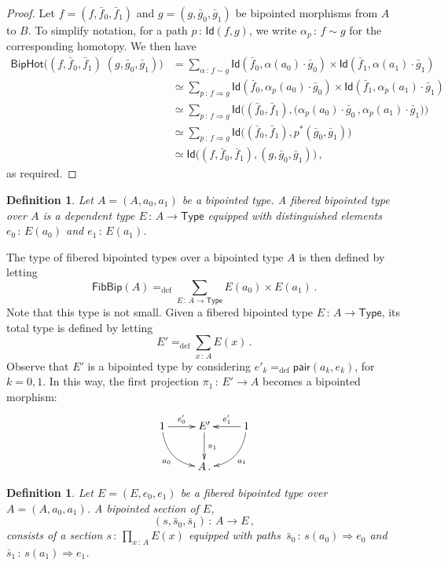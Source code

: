 \documentclass[10pt,a4paper,oneside,reqno]{amsart}
\theoremstyle{mythm}
\theoremstyle{mydef}
\newtheorem{definition}[theorem]{Definition}
\theoremstyle{myrmk}
\newcommand{\deq}{=}
\newcommand{\defeq}{=_{\mathrm{def}}}
\newcommand{\co}{\,{:}\,}
\newcommand{\ct}{\cdot}
\newcommand{\Id}{\mathsf{Id}}
\newcommand{\pair}{\mathsf{pair}}
\newcommand{\U}{\mathsf{Type}}
\newcommand{\BipHot}{\mathsf{BipHot}}
\newcommand{\FibBip}{\mathsf{FibBip}}
\begin{document}
\begin{proof} Let  $f = (f, \bar{f}_0, \bar{f}_1)$ and $g = (g, \bar{g}_0, \bar{g}_1)$ be bipointed
morphisms from $A$ to $B$. To simplify notation, for a path $p \co \Id( f, g)$, we write $\alpha_p \co f \sim g$
for the corresponding homotopy. We then have
\begin{align*}
\BipHot \big( (f,\bar{f}_0,\bar{f}_1) \; (g,\bar{g}_0,\bar{g}_1) \big) & \deq  
\sum_{\alpha \co f \sim g} \Id(\bar{f}_0, \alpha(a_0) \ct \bar{g}_0) \times \Id(\bar{f}_1, \alpha(a_1) \ct \bar{g}_1) \\ 
& \simeq \sum_{p  \co  f \Rightarrow g} \Id(\bar{f}_0, \alpha_p(a_0) \ct \bar{g}_0) \times \Id( \bar{f}_1, \alpha_p(a_1) \ct \bar{g}_1) \\
& \simeq
\sum_{p \co f \Rightarrow g} \Id\big( (\bar{f}_0,\bar{f}_1),  \big(\alpha_p(a_0) \ct \bar{g}_0 \, ,  \alpha_p(a_1) \ct \bar{g}_1) \big) \\
& \simeq
\sum_{p \co  f \Rightarrow g} \Id \big(  (\bar{f}_0,\bar{f}_1),  p^{\ast} (\bar{g}_0,\bar{g}_1) \big) \\
& \simeq  \Id \big( (f,\bar{f}_0,\bar{f}_1) , (g,\bar{g}_0,\bar{g}_1)  \big) \, ,
\end{align*} 
as required.
\end{proof}





\begin{definition} \label{def:fibbipointed}
Let $A = (A, a_0, a_1)$ be a bipointed type. A \emph{fibered bipointed type} over $A$ is a dependent type
$E \co A \to \U$ equipped with distinguished elements $e_0 \co E(a_0)$ and $e_1 \co E(a_1)$.
\end{definition}

The type of  fibered bipointed types over a bipointed type $A$ is then defined by letting
\[
\FibBip(A) \defeq \sum_{E \co A \to \U} E(a_0) \times E(a_1)  \, .
 \]
 Note that this type is not small. 
Given a fibered bipointed type $E \co A \to \U$, its total type is defined by letting
\[
E'  \defeq \sum_{x \co A} E(x) \, .
\] 
Observe that $E'$ is a bipointed type by considering $e'_k \defeq \pair(a_k, e_k)$, 
for $k =  0, 1$. In this way, the first projection $\pi_1 \co E' \to A$ becomes a bipointed morphism:
\[
\xymatrix{
1 \ar@/_1pc/[dr]_{a_0} \ar[r]^-{e'_0} & E' \ar[d]^{\pi_1} & 1 \ar[l]_-{e'_1} \ar@/^1pc/[dl]^{a_1} \\ 
 & A \, .& }
 \]



\begin{definition} \label{def:fibsection} Let $E = (E, e_0, e_1)$ be a fibered bipointed type over
$A = (A, a_0, a_1)$.  A \emph{bipointed section} of $E$, 
\[
(s, \bar{s}_0, \bar{s}_1) \co A \to E \, ,
\]
consists of a section $s \co \prod_{x \co A} E(x)$ equipped with paths~$\bar{s}_0 \co s(a_0) \Rightarrow e_0$ 
and $\bar{s}_1 \co  s(a_1) \Rightarrow e_1$. 
\end{definition} 
\end{document}
